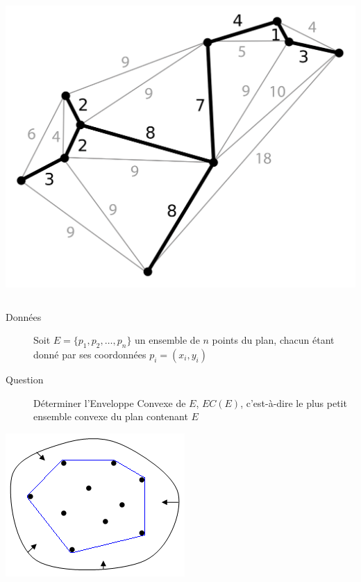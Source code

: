 \documentclass[aspectratio=1610,francais,envcountsect]{beamer}
\begin{document}
\begin{frame}[allowframebreaks]
\begin{columns}
    \begin{column}{0.5\columnwidth}
      \begin{center}
        \includegraphics[width=0.7\columnwidth]{spanning.png}
      \end{center}
    \end{column}
  \end{columns}


  \framebreak

  \begin{definition}

    \begin{description}
    \item [Données] Soit $E = \{p_1, p_2,\ldots , p_n\}$ un ensemble
      de $n$ points du plan, chacun étant donné par ses coordonnées
      $p_i = (x_i, y_i)$

    \item[Question] Déterminer l’Enveloppe Convexe de $E$, $EC(E)$,
      c’est-à-dire le plus petit ensemble convexe du plan contenant
      $E$
    \end{description}
  \end{definition}

  \begin{center}
    \includegraphics[width=0.3\columnwidth]{hull.png}
  \end{center}

  \framebreak


\end{frame}
\end{document}
